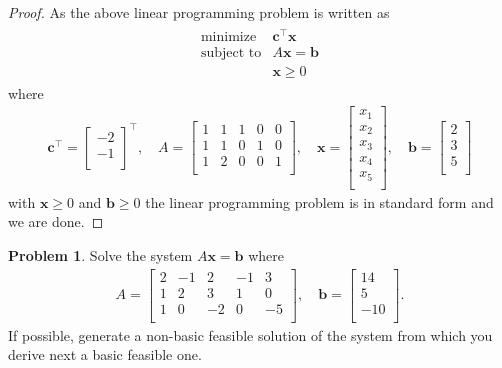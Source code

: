 \documentclass[12pt]{article}
\theoremstyle{definition}
\newtheorem{problem}{Problem}
\newcommand{\vect}[1]{\boldsymbol{#1}}
\begin{document}
\begin{proof}
  As the above linear programming problem is written as
  \begin{align*}
    \begin{array}{rl}
      \text{minimize} & \vect{c}^\intercal \vect{x}\\
      \text{subject to} & A\vect{x} = \vect{b} \\
      & \vect{x} \geq 0
    \end{array}
  \end{align*}
  where
  \begin{align*}
    \vect{c}^\intercal =
    \begin{bmatrix}
      -2 \\
      -1 \\
    \end{bmatrix}^\intercal,
    \quad
    A =
    \begin{bmatrix}
      1 & 1 & 1 & 0 & 0 \\
      1 & 1 & 0 & 1 & 0 \\
      1 & 2 & 0 & 0 & 1 \\
    \end{bmatrix},\quad
    \vect{x} =
    \begin{bmatrix}
      x_1 \\
      x_2 \\
      x_3 \\
      x_4 \\
      x_5 \\
    \end{bmatrix}, \quad
    \vect{b} =
    \begin{bmatrix}
      2 \\
      3 \\
      5 \\
    \end{bmatrix}
  \end{align*}
  with $\vect{x} \geq 0$ and $\vect{b} \geq 0$ the linear programming problem
  is in standard form and we are done.
\end{proof}
\newpage


\begin{problem}
  Solve the system $A\vect{x} = \vect{b}$ where
  \begin{align*}
    A =
    \begin{bmatrix}
      2 & -1 & 2 & -1 & 3 \\
      1 & 2 & 3 & 1 & 0 \\
      1 & 0 & -2 & 0 & -5 \\
    \end{bmatrix}
    , \quad
    \vect{b} = \begin{bmatrix}
      14 \\
      5 \\
      -10 \\
    \end{bmatrix}.
  \end{align*}
  If possible, generate a non-basic feasible solution of the system from which
  you derive next a basic feasible one.
\end{problem}
\end{document}
